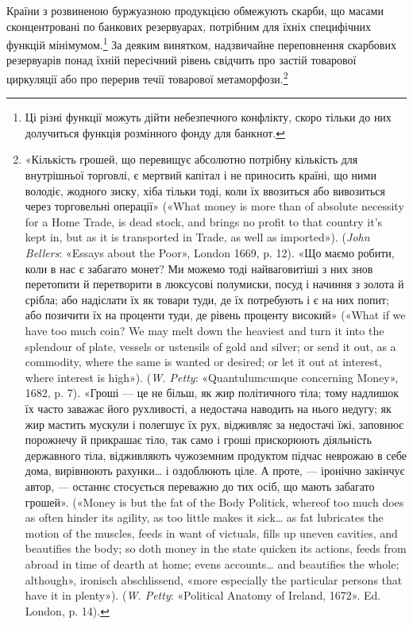 Країни з розвиненою буржуазною продукцією обмежують
скарби, що масами сконцентровані по банкових резервуарах,
потрібним для їхніх специфічних функцій мінімумом.\footnote{
Ці різні функції можуть дійти небезпечного конфлікту, скоро
тільки до них долучиться функція розмінного фонду для банкнот.
} За деяким винятком, надзвичайне переповнення скарбових резервуарів
понад їхній пересічний рівень свідчить про застій товарової
циркуляції або про перерив течії товарової метаморфози.\footnote{
«Кількість грошей, що перевищує абсолютно потрібну кількість
для внутрішньої торговлі, є мертвий капітал і не приносить країні, що
ними володіє, жодного зиску, хіба тільки тоді, коли їх ввозиться
або вивозиться через торговельні операції» («What money is more than
of absolute necessity for a Home Trade, is dead stock, and brings no profit
to that country it’s kept in, but as it is transported in Trade, as well as
imported»). (\emph{John Bellers}: «Essays about the Poor», London 1669, p. 12).
«Що маємо робити, коли в нас є забагато монет? Ми можемо тоді найваговитіші
з них знов перетопити й перетворити в люксусові полумиски,
посуд і начиння з золота й срібла; або надіслати їх як товари туди, де їх
потребують і є на них попит; або позичити їх на проценти туди, де рівень
проценту високий» («What if we have too much coin? We may melt down
the heaviest and turn it into the splendour of plate, vessels or ustensils of
gold and silver; or send it out, as a commodity, where the same is wanted
or desired; or let it out at interest, where interest is high»). (\emph{W. Petty}:
«Quantulumcunque concerning Money», 1682, p. 7). «Гроші — це не
більш, як жир політичного тіла; тому надлишок їх часто заважає його
рухливості, а недостача наводить на нього недугу; як жир мастить мускули
і полегшує їх рух, відживляє за недостачі їжі, заповнює порожнечу й
прикрашає тіло, так само і гроші прискорюють діяльність державного
тіла, відживляють чужоземним продуктом підчас неврожаю в себе дома,
вирівнюють рахунки\dots{} і оздоблюють ціле. А проте, — іронічно закінчує
автор, — останнє стосується переважно до тих осіб, що мають забагато
грошей». («Money is but the fat of the Body Politick, whereof too much
does as often hinder its agility, as too little makes it sick\dots{} as fat lubricates
the motion of the muscles, feeds in want of victuals, fills up uneven cavities,
and beautifies the body; so doth money in the state quicken its actions,
feeds from abroad in time of dearth at home; evens accounts\dots{} and beautifies
the whole; although», ironisch abschlissend, «more especially the particular
persons that have it in plenty»). (\emph{W. Petty}: «Political Anatomy
of Ireland, 1672». Ed. London, p. 14).
}

